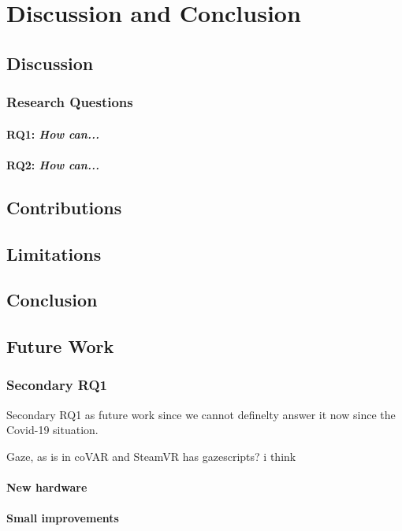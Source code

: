 
\chapter{Discussion and Conclusion}

\section{Discussion}


\subsection{Research Questions}  \label{RQDiscussion}


\subsubsection{RQ1: \textit{How can...}} 


\subsubsection{RQ2: \textit{How can...}}


\section{Contributions}



\section{Limitations}




\section{Conclusion}


\section{Future Work}
\label{section:futureWork}

\subsection{Secondary RQ1}
Secondary RQ1 as future work since we cannot definelty answer it now since the Covid-19 situation.

Gaze, as is in coVAR and SteamVR has gazescripts? i think  

\subsubsection{New hardware}

\subsubsection{Small improvements}

\cleardoublepage